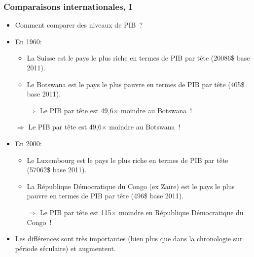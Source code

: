 \documentclass[10pt,notheorems]{beamer}
\theoremstyle{plain}
\theoremstyle{definition} %
\begin{document}
\begin{frame}
  \frametitle{Comparaisons internationales, I}

  \bigskip

  \begin{itemize}

  \item Comment comparer des niveaux de PIB~?\newline

  \item En 1960:

    \begin{itemize}
    \item La Suisse est le pays le plus riche en termes de PIB par tête (20086\$ base 2011).
    \item Le Botswana est le pays le plus pauvre en termes de PIB par tête (405\$ base 2011).
    \item[$\Rightarrow$] Le PIB par tête est 49,6$\times$ moindre au Botswana~!\newline
    \end{itemize}

    $\Rightarrow$ Le PIB par tête est 49,6$\times$ moindre au Botswana~!\newline

  \item En 2000:

    \begin{itemize}
    \item Le Luxembourg est le pays le plus riche en termes de PIB par tête (57062\$ base 2011).
    \item La République Démocratique du Congo (ex Zaïre) est le pays le plus pauvre en termes de PIB par tête (496\$ base 2011).
    \item[$\Rightarrow$] Le PIB par tête est 115$\times$ moindre en République Démocratique du Congo~!\newline
    \end{itemize}

  \item Les différences sont très importantes (bien plus que dans la chronologie sur période séculaire) et augmentent.\newline

  \end{itemize}

\end{frame}
\end{document}
